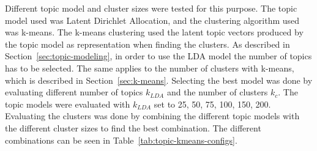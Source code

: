 Different topic model and cluster sizes were tested for this purpose.
The topic model used was Latent Dirichlet Allocation, and the clustering algorithm used was k-means.
The k-means clustering used the latent topic vectors produced by the topic model as representation when finding the clusters.
As described in Section~\ref{sec:topic-modeling}, in order to use the LDA model the number of topics has to be selected.
The same applies to the number of clusters with k-means, which is described in Section~\ref{sec:k-means}.
Selecting the best model was done by evaluating different number of topics $k_{LDA}$ and the number of clusters $k_{c}$.
The topic models were evaluated with $k_{LDA}$ set to 25, 50, 75, 100, 150, 200.
Evaluating the clusters was done by combining the different topic models with the different cluster sizes to find the best combination.
The different combinations can be seen in Table~\ref{tab:topic-kmeans-configs}.
